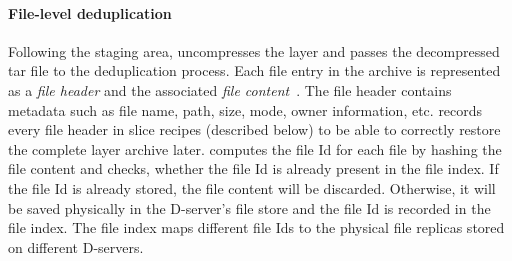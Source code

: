 \paragraph{File-level deduplication}
%
Following the staging area, \sysname
uncompresses the layer and passes the decompressed tar file to the deduplication process.
Each file entry in the archive is represented as a \emph{file header} and the associated
\emph{file content}~\cite{basictar}.
The file header contains metadata such as file name, path, size, mode, owner information, etc.
%
%
\sysname records every file header in slice recipes (described below)
to be able to correctly restore the complete layer archive later.
%
%
%
\sysname computes the file Id for each file by hashing the file content and 
checks, whether the file Id is already present in the file index.
If the file Id is already stored, the file content will be discarded. 
Otherwise, it will be saved physically in the D-server's file store and 
the file Id is recorded in the file index.%
The file index maps different file Ids to the physical file replicas stored
on different D-servers.


